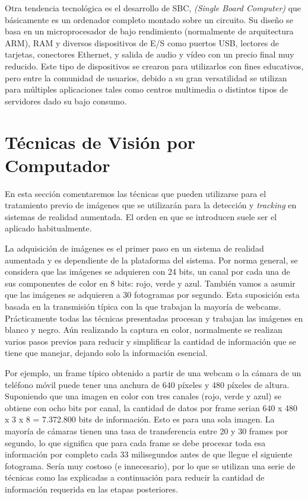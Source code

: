 Otra tendencia tecnológica es el desarrollo de \acs{SBC}, \textit{(Single Board Computer)} que básicamente es un ordenador completo montado sobre un circuito. Su diseño se basa en un microprocesador de bajo rendimiento (normalmente de arquitectura \acs{ARM}), \acs{RAM} y diversos dispositivos de E/S como puertos \acs{USB}, lectores de tarjetas, conectores Ethernet, y salida de audio y vídeo con un precio final muy reducido. Este tipo de dispositivos se crearon para utilizarlos con fines educativos, pero entre la comunidad de usuarios, debido a su gran versatilidad se utilizan para múltiples aplicaciones tales como centros multimedia o distintos tipos de servidores dado su bajo consumo.  

\section{Técnicas de Visión por Computador}
En esta sección comentaremos las técnicas que pueden utilizarse para el tratamiento previo de imágenes que se utilizarán para la detección y \textit{tracking} en sistemas de realidad aumentada. El orden en que se introducen suele ser el aplicado  habitualmente.

La adquisición de imágenes es el primer paso en un sistema de realidad aumentada y es dependiente de la plataforma del sistema. Por norma general, se considera que las imágenes se adquieren con 24 bits, un canal por cada una de sus componentes de color en 8 bits: rojo, verde y azul. También vamos a asumir que las imágenes se adquieren a 30 fotogramas por segundo. Esta suposición esta basada en la transmisión típica con la que trabajan la mayoría de webcams.
Prácticamente todas las técnicas presentadas procesan y trabajan las imágenes en blanco y negro. Aún realizando la captura en color, normalmente se realizan varios pasos previos para reducir y simplificar la cantidad de información que se tiene que manejar, dejando solo la información esencial.

Por ejemplo, un frame típico obtenido a partir de una webcam o la cámara de un teléfono móvil puede tener una anchura de 640 píxeles y 480 píxeles de altura. Suponiendo que una imagen en color con tres canales (rojo, verde y azul) se obtiene con ocho bits por canal, la cantidad de datos por frame serian 640 x 480 x 3 x 8 = 7.372.800 bits de información. Esto es para una sola imagen. La mayoría de cámaras tienen una tasa de transferencia entre 20 y 30 frames por segundo, lo que significa que para cada frame se debe procesar toda esa información por completo cada 33 milisegundos antes de que llegue el siguiente fotograma. Sería muy costoso (e innecesario), por lo que se utilizan una serie de técnicas como las explicadas a continuación para reducir la cantidad de información requerida en las etapas posteriores.

